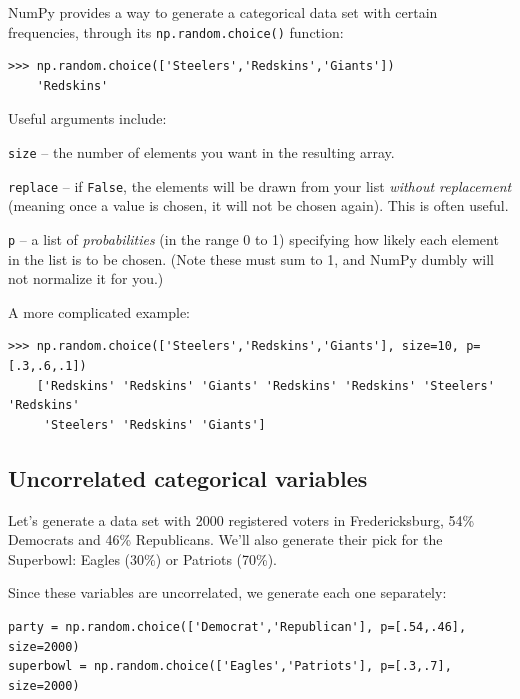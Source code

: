 NumPy provides a way to generate a categorical data set with certain
frequencies, through its \texttt{np.random.choice()} function:

\begin{Verbatim}[fontsize=\small,samepage=true,frame=single]
>>> np.random.choice(['Steelers','Redskins','Giants'])
    'Redskins'
\end{Verbatim}

Useful arguments include:

\begin{compactitem}
\item \texttt{size} -- the number of elements you want in the resulting array.
\item \texttt{replace} -- if \texttt{False}, the elements will be drawn from
your list \textit{without replacement} (meaning once a value is chosen, it
will not be chosen again). This is often useful.
\item \texttt{p} -- a list of \textit{probabilities} (in the range 0 to 1)
specifying how likely each element in the list is to be chosen. (Note these
must sum to 1, and NumPy dumbly will not normalize it for you.)
\end{compactitem}

A more complicated example:
\begin{Verbatim}[fontsize=\footnotesize,samepage=true,frame=single]
>>> np.random.choice(['Steelers','Redskins','Giants'], size=10, p=[.3,.6,.1])
    ['Redskins' 'Redskins' 'Giants' 'Redskins' 'Redskins' 'Steelers' 'Redskins'
     'Steelers' 'Redskins' 'Giants']
\end{Verbatim}


\subsection{Uncorrelated categorical variables}

Let's generate a data set with 2000 registered voters in Fredericksburg, 54\%
Democrats and 46\% Republicans. We'll also generate their pick for the
Superbowl: Eagles (30\%) or Patriots (70\%).

Since these variables are uncorrelated, we generate each one separately:

\begin{Verbatim}[fontsize=\footnotesize,samepage=true]
party = np.random.choice(['Democrat','Republican'], p=[.54,.46], size=2000)
superbowl = np.random.choice(['Eagles','Patriots'], p=[.3,.7], size=2000)
\end{Verbatim}


